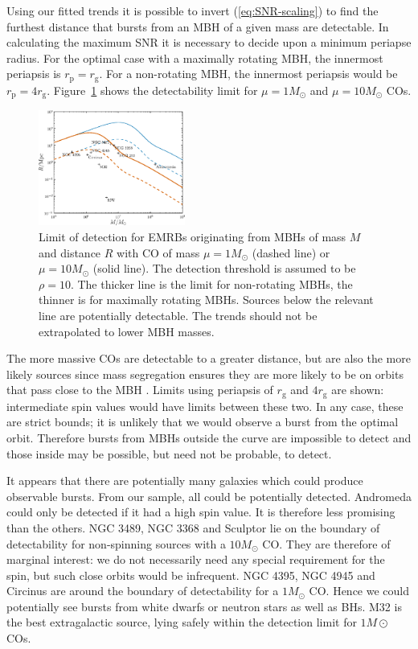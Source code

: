 \documentclass[useAMS,usedcolumn,usegraphicx,usenatbib]{mn2e}
\newcommand{\eqnref}[1]{(\ref{eq:#1})}
\newcommand{\Figref}[1]{Figure~\ref{fig:#1}}
\newcommand{\sub}[1]{\ensuremath{_\mathrm{#1}}}
\begin{document}
Using our fitted trends it is possible to invert \eqnref{SNR-scaling} to find the furthest distance that bursts from an MBH of a given mass are detectable. In calculating the maximum SNR it is necessary to decide upon a minimum periapse radius. For the optimal case with a maximally rotating MBH, the innermost periapsis is $r\sub{p} = r\sub{g}$. For a non-rotating MBH, the innermost periapsis would be $r\sub{p} = 4r\sub{g}$. \Figref{detect} shows the detectability limit for $\mu = 1 M_\odot$ and $\mu = 10 M_\odot$ COs.
\begin{figure}
\begin{center}
 \includegraphics[width=0.43\textwidth]{Fig_M_R_detect_1}
 \caption{Limit of detection for EMRBs originating from MBHs of mass $M$ and distance $R$ with CO of mass $\mu = 1 M_\odot$ (dashed line) or $\mu = 10 M_\odot$ (solid line). The detection threshold is assumed to be $\rho = 10$. The thicker line is the limit for non-rotating MBHs, the thinner is for maximally rotating MBHs. Sources below the relevant line are potentially detectable. The trends should not be extrapolated to lower MBH masses.\label{fig:detect}}
   \end{center}
\end{figure}
The more massive COs are detectable to a greater distance, but are also the more likely sources since mass segregation ensures they are more likely to be on orbits that pass close to the MBH \citep{Bahcall1977, Alexander2009, Preto2010}. Limits using periapsis of $r\sub{g}$ and $4r\sub{g}$ are shown: intermediate spin values would have limits between these two. In any case, these are strict bounds; it is unlikely that we would observe a burst from the optimal orbit. Therefore bursts from MBHs outside the curve are impossible to detect and those inside may be possible, but need not be probable, to detect.

It appears that there are potentially many galaxies which could produce observable bursts. From our sample, all could be potentially detected. Andromeda could only be detected if it had a high spin value. It is therefore less promising than the others. NGC 3489, NGC 3368 and Sculptor lie on the boundary of detectability for non-spinning sources with a $10 M_\odot$ CO. They are therefore of marginal interest: we do not necessarily need any special requirement for the spin, but such close orbits would be infrequent. NGC 4395, NGC 4945 and Circinus are around the boundary of detectability for a $1 M_\odot$ CO. Hence we could potentially see bursts from white dwarfs or neutron stars as well as BHs. M32 is the best extragalactic source, lying safely within the detection limit for $1 M\odot$ COs.
\end{document}
